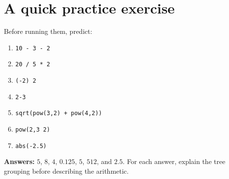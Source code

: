 \documentclass[11pt,a4paper]{report}
\begin{document}
\section{A quick practice exercise}
Before running them, predict:
\begin{enumerate}
\item \texttt{10 - 3 - 2}
\item \texttt{20 / 5 * 2}
\item \texttt{(-2) 2}
\item \texttt{2-3}
\item \texttt{sqrt(pow(3,2) + pow(4,2))}
\item \texttt{pow(2,3 2)}
\item \texttt{abs(-2.5)}
\end{enumerate}
\textbf{Answers:} $5$, $8$, $4$, $0.125$, $5$, $512$, and $2.5$.
For each answer, explain the tree grouping before describing the arithmetic.
\end{document}
